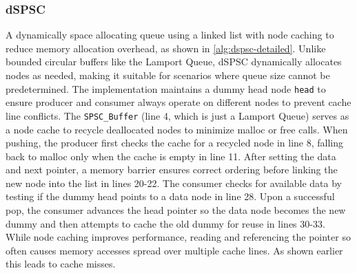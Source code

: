 \subsubsection{\acl{dSPSC}}
A dynamically space allocating queue using a linked list with node caching to reduce memory allocation overhead, as shown in \cref{alg:dspsc-detailed}. Unlike bounded circular buffers like the Lamport Queue, dSPSC dynamically allocates nodes as needed, making it suitable for scenarios where queue size cannot be predetermined. The implementation maintains a dummy head node \texttt{head} to ensure producer and consumer always operate on different nodes to prevent cache line conflicts. The \texttt{SPSC\_Buffer} (line 4, which is just a Lamport Queue) serves as a node cache to recycle deallocated nodes to minimize malloc or free calls. When pushing, the producer first checks the cache for a recycled node in line 8, falling back to malloc only when the cache is empty in line 11. After setting the data and next pointer, a memory barrier ensures correct ordering before linking the new node into the list in lines 20-22. The consumer checks for available data by testing if the dummy head points to a data node in line 28. Upon a successful pop, the consumer advances the head pointer so the data node becomes the new dummy and then attempts to cache the old dummy for reuse in lines 30-33. While node caching improves performance, reading and referencing the pointer so often causes memory accesses spread over multiple cache lines. As shown earlier this leads to cache misses. \cite{torquati2010singleproducersingleconsumerqueuessharedcache}

